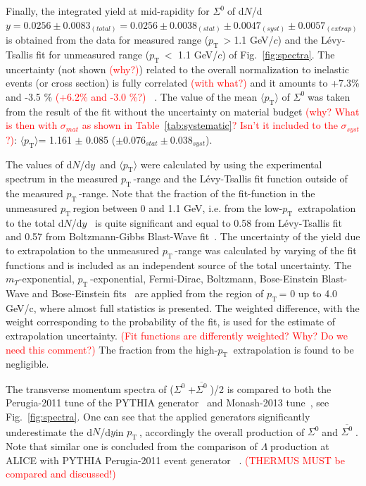 \documentclass[ALICE,manyauthors]{cernphprep}
\newcommand{\mpt}{\langle p_{\mathrm{T}}\rangle}
\newcommand{\dndy}{d$N$/d$y$\;}
\newcommand{\sig}{\ensuremath{\Sigma^0  \; }}
\newcommand{\asig}{\ensuremath{\overline{\Sigma^0} \; }}
\newcommand{\lam}{\ensuremath{\Lambda \; }}
\newcommand{\meanpt}{ \ensuremath{\langle p_{\mathrm{T}} \rangle}}
\newcommand{\pt}{\ensuremath{p_{\mathrm{T}\; }}}
\newcommand{\red}{\textcolor{red}}
\begin{document}
Finally, the integrated yield at mid-rapidity for \sig of d$N$/d$y = 0.0256  \pm 0.0083_{(total)} = 0.0256   \pm 0.0038_{(stat)} 
\pm 0.0047_{(syst)} \pm 0.0057_{(extrap)}$ is obtained from the data for measured range (\pt $>$1.1 GeV/$c$) and 
the L\'{e}vy-Tsallis fit for unmeasured range (\pt $<$ 1.1 GeV/$c$) of Fig.~\ref{fig:spectra}.
The uncertainty (not shown \red{(why?)}) related  to the overall normalization to inelastic events (or cross section) 
is fully correlated \red{(with what?)} and it amounts to +7.3\% and -3.5 \% \red{(+6.2\% and -3.0 \%?)}
~\cite{cite:ALICE-inelasticXsection,cite:Xi_pp}.
The value of the mean $\mpt$ of  \sig was taken from the result of the fit without the uncertainty on material 
budget \red{(why? What is then with $\sigma_{mat}$ as shown in Table~\ref{tab:systematic}?
Isn't it included to the $\sigma_{syst}$?)}: \meanpt = 1.161 $\pm$ 0.085 ($\pm 0.076_{stat} \pm 0.038_{syst}$). 

The values of \dndy~and $\mpt$ were calculated by using the experimental 
spectrum in the measured \pt-range and the L\'{e}vy-Tsallis fit function outside of the measured \pt-range.
Note that the fraction of the fit-function in the unmeasured \pt region between 0 and 1.1 GeV, i.e.
 from the low-$\pt$ extrapolation to the total \dndy~ is quite significant and equal  
to 0.58 from L\'{e}vy-Tsallis fit and 0.57 from Boltzmann-Gibbs Blast-Wave fit~\cite{cite:blastwave}.
The uncertainty of the yield due to extrapolation to the unmeasured \pt-range 
was calculated by varying of the fit functions and is included as an independent source of the total uncertainty.
The $m_T$-exponential,  \pt-exponential,   Fermi-Dirac,  Boltzmann, Bose-Einstein Blast-Wave and 
Bose-Einstein fits~\cite{cite:STAR-ratio_to_pion,cite:STAR-Kstar-2005} are applied
from the region of \pt = 0 up to  4.0 GeV/c, where almost full statistics is presented.  
The weighted difference, with the weight corresponding to the probability of the fit, is used for the 
estimate of extrapolation uncertainty. \red{(Fit functions are differently weighted? Why? Do we need this comment?)}
The fraction from the high-$\pt$ extrapolation is found to be negligible. 

The transverse momentum spectra of (\sig+\asig)/2 is compared to both the Perugia-2011 tune of
the PYTHIA generator~\cite{cite:pythia6} and Monash-2013 tune~\cite{cite:PYTHIA-8-Monash-gener}, 
see Fig.~\ref{fig:spectra}. One can see that the applied generators significantly underestimate the \dndy in \pt, 
accordingly the overall production of \sig and \asig. Note that similar one is concluded from the 
comparison of \lam production at ALICE with PYTHIA Perugia-2011 event generator
~\cite{cite:lambda_pp,cite:Lam-PLB14}. \red{(THERMUS MUST be compared and discussed!)}
\end{document}
